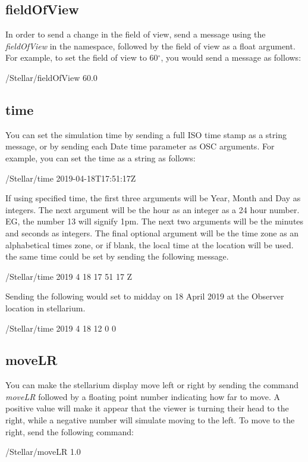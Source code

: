\subsection{fieldOfView}\label{subsec:fieldofview} 

In order to send a change in the field of view, send a message using the \textit{fieldOfView} in the namespace, followed by the field of view as a float argument. For example, to set the field of view to 60$^{\circ}$, you would send a message as follows:
 \begin{syntax}	
 	\medskip
	/Stellar/fieldOfView 60.0
	\medskip
 \end{syntax}
\bigskip

 \subsection{time} 
You can set the simulation time by sending a full ISO time stamp as a string message, or by sending each Date time parameter as OSC arguments. For example, you can set the time as a string as follows:

\begin{syntax}	
	\medskip
	/Stellar/time 2019-04-18T17:51:17Z
	\medskip
\end{syntax}

If using specified time, the first three arguments will be  Year, Month and  Day as integers. The next  argument will be the hour as an integer as a 24 hour number. EG, the number 13 will signify 1pm. The next two arguments will be the minutes and seconds as integers.  The final optional argument will be the time zone as an alphabetical times zone, or if blank, the local time at the location will be used.  the same time could be set by sending the following message.
\begin{syntax}	
	\medskip
	/Stellar/time 2019 4 18 17 51 17 Z
	\medskip
\end{syntax}

Sending the following would set to midday on 18 April 2019 at the Observer location in stellarium.

\begin{syntax}	
	\medskip
	/Stellar/time 2019 4 18 12 0 0 
	\medskip
\end{syntax}


\subsection{moveLR} 
You can make the stellarium display move left or right by sending the command \textit{moveLR} followed by a floating point number indicating how far to move. A positive value will make it appear that the viewer is turning their head to the right, while a negative number will simulate moving to the left. To move to the right, send the following command:
  \begin{syntax}	
 	\medskip
 	/Stellar/moveLR 1.0
 	\medskip
 \end{syntax}
 \bigskip

